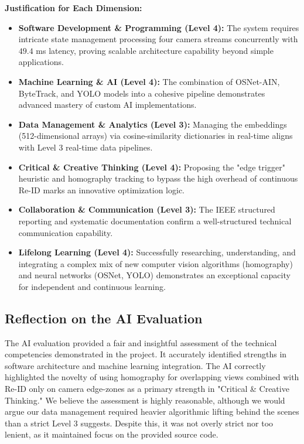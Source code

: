 \noindent\textbf{Justification for Each Dimension:}
\begin{itemize}
    \item \textbf{Software Development \& Programming (Level 4):} The system requires intricate state management processing four camera streams concurrently with $49.4$ ms latency, proving scalable architecture capability beyond simple applications.
    \item \textbf{Machine Learning \& AI (Level 4):} The combination of OSNet-AIN, ByteTrack, and YOLO models into a cohesive pipeline demonstrates advanced mastery of custom AI implementations.
    \item \textbf{Data Management \& Analytics (Level 3):} Managing the embeddings (512-dimensional arrays) via cosine-similarity dictionaries in real-time aligns with Level 3 real-time data pipelines.
    \item \textbf{Critical \& Creative Thinking (Level 4):} Proposing the "edge trigger" heuristic and homography tracking to bypass the high overhead of continuous Re-ID marks an innovative optimization logic.
    \item \textbf{Collaboration \& Communication (Level 3):} The IEEE structured reporting and systematic documentation confirm a well-structured technical communication capability.
    \item \textbf{Lifelong Learning (Level 4):} Successfully researching, understanding, and integrating a complex mix of new computer vision algorithms (homography) and neural networks (OSNet, YOLO) demonstrates an exceptional capacity for independent and continuous learning.
\end{itemize}

\subsection{Reflection on the AI Evaluation}

The AI evaluation provided a fair and insightful assessment of the technical competencies demonstrated in the project. It accurately identified strengths in software architecture and machine learning integration. The AI correctly highlighted the novelty of using homography for overlapping views combined with Re-ID only on camera edge-zones as a primary strength in "Critical \& Creative Thinking." We believe the assessment is highly reasonable, although we would argue our data management required heavier algorithmic lifting behind the scenes than a strict Level 3 suggests. Despite this, it was not overly strict nor too lenient, as it maintained focus on the provided source code.

